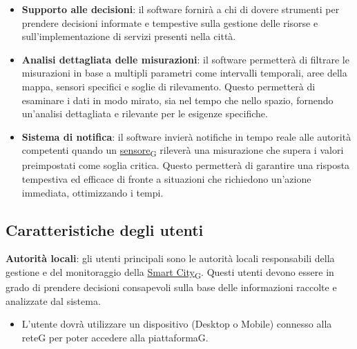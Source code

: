 \begin{itemize}
    \item \textbf{Supporto alle decisioni}: il software fornirà a chi di dovere strumenti per prendere decisioni informate e tempestive sulla gestione delle risorse e sull’implementazione di servizi presenti nella città.
    \item \textbf{Analisi dettagliata delle misurazioni}: il software permetterà di filtrare le misurazioni in base a multipli parametri come intervalli temporali, aree della mappa, sensori specifici e soglie di rilevamento. Questo permetterà di esaminare i dati in modo mirato, sia nel tempo che nello spazio, fornendo un’analisi dettagliata e rilevante per le esigenze specifiche.
    \item \textbf{Sistema di notifica}: il software invierà notifiche in tempo reale alle autorità competenti quando un \href{https://7last.github.io/docs/rtb/documentazione-interna/glossario\#sensore}{sensore\textsubscript{G}} rileverà una misurazione che supera i valori preimpostati come soglia critica. Questo permetterà di garantire una risposta tempestiva ed efficace di fronte a situazioni che richiedono un’azione immediata, ottimizzando i tempi.
\end{itemize}

\subsection{Caratteristiche degli utenti} %
\textbf{Autorità locali}: gli utenti principali sono le autorità locali responsabili della gestione e del monitoraggio della \href{https://7last.github.io/docs/rtb/documentazione-interna/glossario\#smart-city}{Smart City\textsubscript{G}}. Questi utenti devono essere in grado di prendere decisioni consapevoli sulla base delle informazioni raccolte e analizzate dal sistema.\\
\begin{itemize}
    \item L’utente dovrà utilizzare un dispositivo (Desktop o Mobile) connesso alla reteG per poter accedere alla piattaformaG.
\end{itemize}

